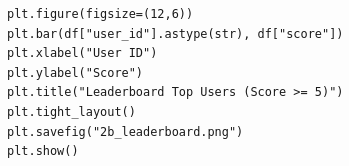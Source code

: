 \documentclass[12pt,a4paper]{article}
\begin{document}
\begin{enumerate}
\begin{enumerate}
\begin{verbatim}
plt.figure(figsize=(12,6))
plt.bar(df["user_id"].astype(str), df["score"])
plt.xlabel("User ID")
plt.ylabel("Score")
plt.title("Leaderboard Top Users (Score >= 5)")
plt.tight_layout()
plt.savefig("2b_leaderboard.png")
plt.show()            
        \end{verbatim}
    \end{enumerate}
\end{enumerate}
\end{document}
